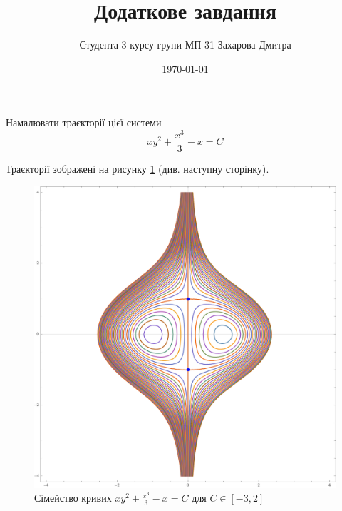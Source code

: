 \documentclass[14pt]{extarticle}
\title{Додаткове завдання}
\author{Студента 3 курсу групи МП-31 Захарова Дмитра}
\date{\today}
\begin{document}
\maketitle

Намалювати траєкторії цієї системи
\[
xy^2 + \frac{x^3}{3}-x = C
\]

Траєкторії зображені на рисунку \ref{fig:1} (див. наступну сторінку). 
\begin{figure}[H]
    \centering
    \includegraphics[width=\textwidth]{images/addition/additional_diff_eq.png}
    \caption{Сімейство кривих $xy^2 + \frac{x^3}{3}-x = C$ для $C\in [-3,2]$}
    \label{fig:1}
\end{figure}
\end{document}
